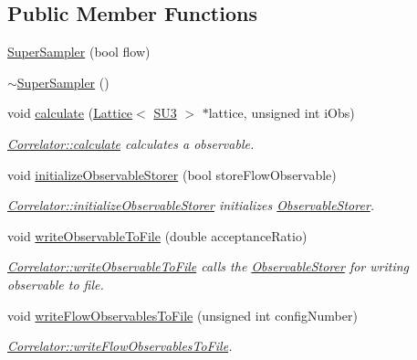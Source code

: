 \subsection*{Public Member Functions}
\begin{DoxyCompactItemize}
\item 
\mbox{\hyperlink{class_super_sampler_a6bf01b68f9befc5bf01c822e28c0c88d}{Super\+Sampler}} (bool flow)
\item 
\mbox{\hyperlink{class_super_sampler_a55e62dd765b7e85d629fb4ff07208d6d}{$\sim$\+Super\+Sampler}} ()
\item 
void \mbox{\hyperlink{class_super_sampler_a7e1457583270077c4fbcb288ea9b954c}{calculate}} (\mbox{\hyperlink{class_lattice}{Lattice}}$<$ \mbox{\hyperlink{class_s_u3}{S\+U3}} $>$ $\ast$lattice, unsigned int i\+Obs)
\begin{DoxyCompactList}\small\item\em \mbox{\hyperlink{class_correlator_ab33502ff305f891c5c2e6d66a26a0247}{Correlator\+::calculate}} calculates a observable. \end{DoxyCompactList}\item 
void \mbox{\hyperlink{class_super_sampler_a4429d6ae37247a02259bc0c6d665821c}{initialize\+Observable\+Storer}} (bool store\+Flow\+Observable)
\begin{DoxyCompactList}\small\item\em \mbox{\hyperlink{class_correlator_ab99886c09dd27dfc8676d0032cecf9bc}{Correlator\+::initialize\+Observable\+Storer}} initializes \mbox{\hyperlink{class_observable_storer}{Observable\+Storer}}. \end{DoxyCompactList}\item 
void \mbox{\hyperlink{class_super_sampler_a05b42b82879233dc329d280a61bfd7f0}{write\+Observable\+To\+File}} (double acceptance\+Ratio)
\begin{DoxyCompactList}\small\item\em \mbox{\hyperlink{class_correlator_a9e8d80e30e4fbe3b7fe57521538cb5ff}{Correlator\+::write\+Observable\+To\+File}} calls the \mbox{\hyperlink{class_observable_storer}{Observable\+Storer}} for writing observable to file. \end{DoxyCompactList}\item 
void \mbox{\hyperlink{class_super_sampler_a410b650ebccdb03519c88908a3a8013e}{write\+Flow\+Observables\+To\+File}} (unsigned int config\+Number)
\begin{DoxyCompactList}\small\item\em \mbox{\hyperlink{class_correlator_a168512b2ce182d9478db47f100125fa6}{Correlator\+::write\+Flow\+Observables\+To\+File}}. \end{DoxyCompactList}\item 

\end{DoxyCompactItemize}
